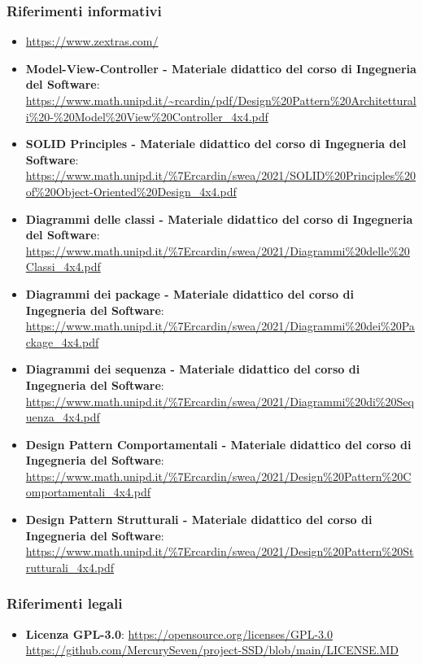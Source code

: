 \subsubsection{Riferimenti informativi}

\begin{itemize}
	\item \url{https://www.zextras.com/}
	
	\item \textbf{Model-View-Controller - Materiale didattico del corso di Ingegneria del Software}: \newline{}
	\url{https://www.math.unipd.it/~rcardin/pdf/Design\%20Pattern\%20Architetturali\%20-\%20Model\%20View\%20Controller_4x4.pdf}
	\item \textbf{SOLID Principles - Materiale didattico del corso di Ingegneria del Software}: \newline{}
	\url{https://www.math.unipd.it/\%7Ercardin/swea/2021/SOLID\%20Principles\%20of\%20Object-Oriented\%20Design_4x4.pdf}
	\item \textbf{Diagrammi delle classi - Materiale didattico del corso di Ingegneria del Software}: \newline{}
	\url{https://www.math.unipd.it/\%7Ercardin/swea/2021/Diagrammi\%20delle\%20Classi_4x4.pdf}
	\item \textbf{Diagrammi dei package - Materiale didattico del corso di Ingegneria del Software}: \newline{}
	\url{https://www.math.unipd.it/\%7Ercardin/swea/2021/Diagrammi\%20dei\%20Package_4x4.pdf}
	\item \textbf{Diagrammi dei sequenza - Materiale didattico del corso di Ingegneria del Software}: \newline{}
	\url{https://www.math.unipd.it/\%7Ercardin/swea/2021/Diagrammi\%20di\%20Sequenza_4x4.pdf}
	\item \textbf{Design Pattern Comportamentali - Materiale didattico del corso di Ingegneria del Software}: \newline{} \url{https://www.math.unipd.it/\%7Ercardin/swea/2021/Design\%20Pattern\%20Comportamentali_4x4.pdf}
	\item \textbf{Design Pattern Strutturali - Materiale didattico del corso di Ingegneria del Software}: \newline{}
	\url{https://www.math.unipd.it/\%7Ercardin/swea/2021/Design\%20Pattern\%20Strutturali_4x4.pdf}
	
	
\end{itemize}

\subsubsection{Riferimenti legali}

\begin{itemize}
	\item \textbf{Licenza GPL-3.0}:\newline{}
	\url{https://opensource.org/licenses/GPL-3.0}\newline{}
	\url{https://github.com/MercurySeven/project-SSD/blob/main/LICENSE.MD}
\end{itemize}


